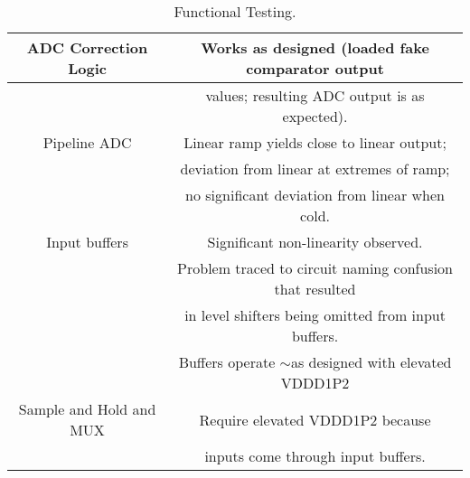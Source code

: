 \begin{table}[h]
\begin{tabular}{|c|c|}
 ADC Correction Logic & Works as designed (loaded fake comparator output \\ \hline
  & values; resulting ADC output is as expected). \\ \hline
Pipeline ADC & Linear ramp yields close to linear output; \\ \hline
 & deviation from linear at extremes of ramp; \\ \hline
  & no significant deviation from linear when cold. \\ \hline
Input buffers & Significant non-linearity observed. \\ \hline
 & Problem traced to circuit naming confusion that resulted \\ \hline
 & in level shifters being omitted from input buffers. \\ \hline
 & Buffers operate $\sim$as designed with elevated VDDD1P2 \\ \hline
 Sample and Hold and MUX & Require elevated VDDD1P2 because \\ \hline
 & inputs come through input buffers. \\ \hline
\end{tabular}
\caption{Functional Testing.}
\label{tab:Functionality}
\end{table}